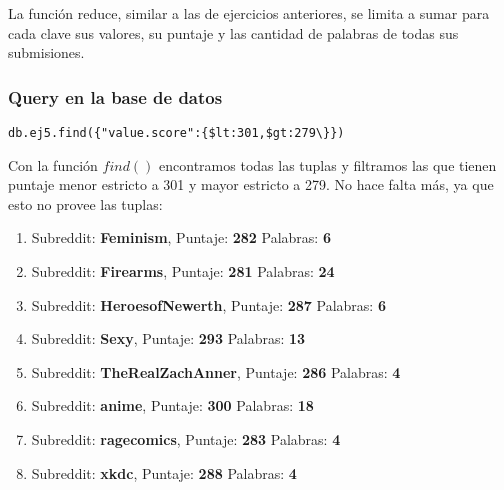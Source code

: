 La funci\'on reduce, similar a las de ejercicios anteriores, se limita a sumar para cada clave sus valores, su puntaje y las cantidad de palabras de todas sus submisiones.

\vspace{2mm}

\subsubsection{Query en la base de datos}

\begin{lstlisting}
db.ej5.find({"value.score":{$lt:301,$gt:279\}})
\end{lstlisting}

Con la funci\'on $find()$ encontramos todas las tuplas y filtramos las que tienen puntaje menor estricto a 301 y mayor estricto a 279. No hace falta m\'as, ya que esto no provee las tuplas:

\begin{enumerate}

\item Subreddit: \textbf{Feminism}, Puntaje: \textbf{282} Palabras: \textbf{6}
\item Subreddit: \textbf{Firearms}, Puntaje: \textbf{281} Palabras: \textbf{24}
\item Subreddit: \textbf{HeroesofNewerth}, Puntaje: \textbf{287} Palabras: \textbf{6}
\item Subreddit: \textbf{Sexy}, Puntaje: \textbf{293} Palabras: \textbf{13}
\item Subreddit: \textbf{TheRealZachAnner}, Puntaje: \textbf{286} Palabras: \textbf{4}
\item Subreddit: \textbf{anime}, Puntaje: \textbf{300} Palabras: \textbf{18}
\item Subreddit: \textbf{ragecomics}, Puntaje: \textbf{283} Palabras: \textbf{4}
\item Subreddit: \textbf{xkdc}, Puntaje: \textbf{288} Palabras: \textbf{4}

\end{enumerate}
